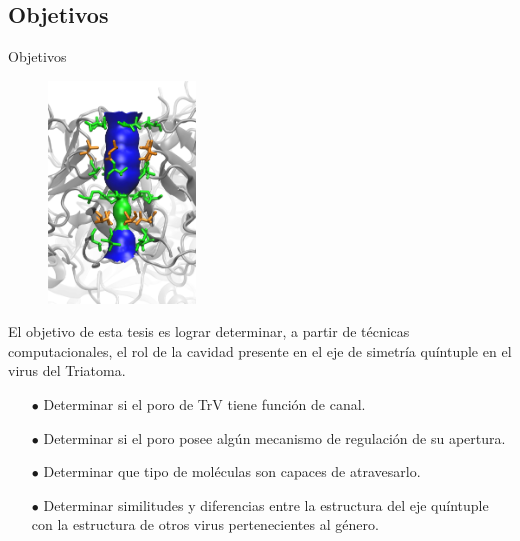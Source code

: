 \documentclass[8pt]{beamer}
\begin{document}
\subsection*{Objetivos}
\begin{frame}[t]{Objetivos}
\justifying
\begin{figure}
\vspace{-0.5cm}
\Centering
\includegraphics[width=0.35\textwidth]{Figure/TrV_Sideview_Pore_2.png}
\end{figure}

El objetivo de esta tesis es lograr determinar, a partir de técnicas computacionales, el rol de la cavidad presente en el eje de simetría quíntuple en el virus del Triatoma.
\begin{itemize}
\justifying
\item[$\bullet$] Determinar si el poro de TrV tiene función de canal.
\item[$\bullet$] Determinar si el poro posee algún mecanismo de regulación de su apertura.
\item[$\bullet$] Determinar que tipo de moléculas son capaces de atravesarlo.
\item[$\bullet$] Determinar similitudes y diferencias entre la estructura del eje quíntuple con la estructura de otros virus pertenecientes al género.
\end{itemize}

\end{frame}

\begin{frame}[t]
  \tableofcontents
\end{frame}

\end{document}
